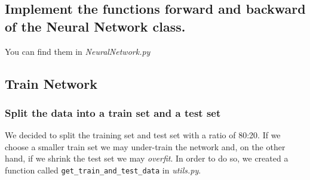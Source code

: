 \documentclass[11pt]{article}
\begin{document}
\subsection{Implement the functions forward and backward of the Neural Network class.}
You can find them in \emph{NeuralNetwork.py}
\subsection{Train Network}
\subsubsection{ Split the data into a train set and a test set}
We decided to split the training set and test set with a ratio of 80:20. If we choose a smaller train set we may under-train the network and, on the other hand, if we shrink the test set we may \emph{overfit}. In order to do so, we created a function called \texttt{get\_train\_and\_test\_data} in \emph{utils.py}.
\end{document}
